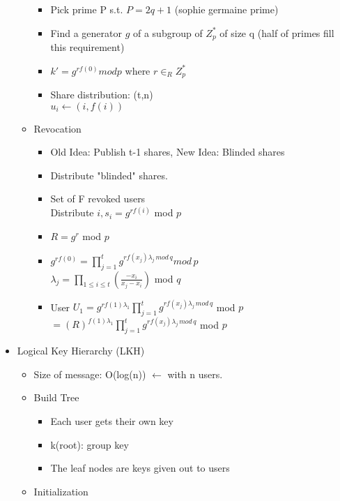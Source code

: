 \begin{itemize}
\begin{itemize}
        \begin{itemize}
        \item Pick prime P s.t. $P = 2q + 1$ (sophie germaine prime)
        \item Find a generator $g$ of a subgroup of $Z_p^*$ of size q (half of primes fill this requirement)
        \item $k' = g^{rf(0)} mod p$ where $r \in_R Z_p^*$
        \item Share distribution: (t,n)
            \\ $u_i \leftarrow (i, f(i))$
        \end{itemize}
    \item Revocation
        \begin{itemize}
        \item Old Idea: Publish t-1 shares, New Idea: Blinded shares
        \item Distribute "blinded" shares. 
        \item Set of F revoked users
            \\Distribute $i,s_i = g^{rf(i)}$ mod $p$
        \item $R = g^r$ mod $p$
        \item $g^{rf(0)} = \prod_{j=1}^t g^{rf(x_j)\lambda_j\,mod\, q} mod\,p$
            \\$\lambda_j = \prod_{1 \le i \le t}(\frac{-x_i}{x_j-x_i})$ mod $q$
        \item User $U_1 = g^{rf(1)\lambda_1} \prod_{j=1}^t g^{rf(x_j)\lambda_j\,mod\,q}$ mod $p$
            \\ $= (R)^{f(1)\lambda_1} \prod_{j=1}^t g^{rf(x_j)\lambda_j\,mod\,q}$ mod $p$
        \end{itemize}
    \end{itemize}
\item Logical Key Hierarchy (LKH)
    \begin{itemize}
    \item Size of message: O(log(n)) $\leftarrow$ with n users.
    \item Build Tree
        \begin{itemize}
        \item Each user gets their own key
        \item k(root): group key
        \item The leaf nodes are keys given out to users
        \end{itemize}
    \item Initialization
        \begin{itemize}

\end{itemize}
\end{itemize}
\end{itemize}
